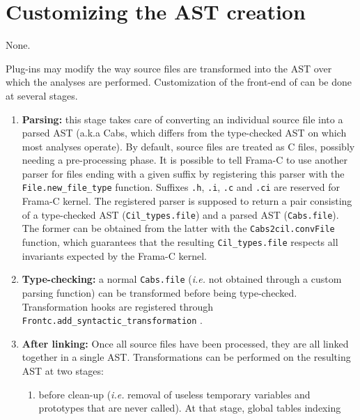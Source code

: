
\section{Customizing the AST creation}\label{sec:customizing-ast}
\begin{prereq}
  None.
\end{prereq}

Plug-ins may modify the way source files are transformed into the AST
over which the analyses are performed. Customization of the front-end of
\framac can be done at several stages.

\begin{enumerate}[A --]
\item\textbf{Parsing:} this stage takes care of converting an individual source
file into a parsed AST (a.k.a Cabs, which differs from the type-checked AST on
which most analyses operate). By default, source files are treated as C files,
possibly needing a pre-processing phase. It is possible to tell Frama-C to use
another parser for files ending with a given suffix by registering this
parser with the \texttt{File.new\_file\_type}
function. Suffixes \texttt{.h}, \texttt{.i}, \texttt{.c} and \texttt{.ci}
are reserved for
Frama-C kernel. The registered parser is supposed to return a pair consisting
of a type-checked AST (\verb+Cil_types.file+) and
a parsed AST (\verb+Cabs.file+). The former can be obtained
from the latter with the \verb+Cabs2cil.convFile+
function, which guarantees that the resulting \verb+Cil_types.file+ respects
all invariants expected by the Frama-C kernel.
\item\textbf{Type-checking:} a normal \verb+Cabs.file+ ({\it i.e.} not obtained
through a custom parsing function) can be transformed before being 
type-checked. Transformation hooks are registered through
\verb+Frontc.add_syntactic_transformation+%
.
\item\textbf{After linking:} Once all source files have been processed, they
  are all linked together in a single AST. Transformations can be performed
  on the resulting AST at two stages:
  \begin{enumerate}[1.]
  \item before clean-up ({\it i.e.} removal of useless temporary variables
    and prototypes that are never called). At that stage, global tables indexing

\end{enumerate}
\end{enumerate}
